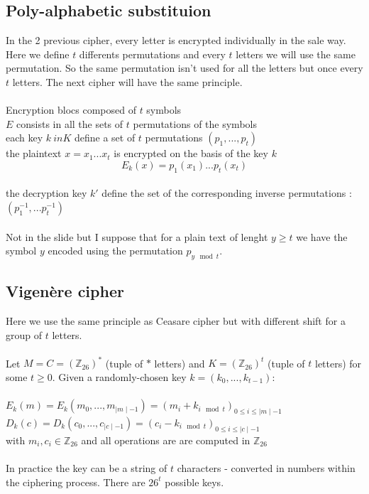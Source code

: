 \documentclass[11pt,a4paper]{report}
\begin{document}
\subsection{Poly-alphabetic substituion}
In the 2 previous cipher, every letter is encrypted individually in the sale way. Here we define $t$ differents permutations and every $t$ letters we will use the same permutation. So the same permutation isn't used for all the letters but once every $t$ letters. The next cipher will have the same principle.\\
\\
Encryption blocs composed of $t$ symbols\\
$E$ consists in all the sets of $t$ permutations of the symbols\\
each key $k \ in K$ define a set of $t$ permutations $\left( p_1,...,p_t \right)$\\
the plaintext $x = x_1 ... x_t$ is encrypted on the basis of the key $k$
$$E_k(x) = p_1(x_1) ... p_t(x_t)$$\\
 the decryption key $k'$ define the set of the corresponding inverse permutations : $\left( p_1^{-1} , ... p_t^{-1} \right)$\\
 \\Not in the slide but I suppose that for a plain text of lenght $ y \geq t$ we have the symbol $y$ encoded using the permutation $p_{y\mod t}$.

\subsection{Vigenère cipher}
Here we use the same principle as Ceasare cipher but with different shift for a group of $t$ letters.\\
\\
Let $M = C = \left( \mathbb{Z}_{26} \right)^* $ (tuple of $*$ letters) and $K = \left( \mathbb{Z}_{26} \right)^t$ (tuple of $t$ letters) for some $t \geq 0$. Given a randomly-chosen key $k = (k_0, ..., k_{t-1})$:\\
\\
$E_k(m) = E_k(m_0,...,m_{\mid m \mid -1}) = (m_i + k_{i\mod t})_{0 \leq i \leq \mid m \mid -1}$\\
$D_k(c) = D_k(c_0,...,c_{\mid c \mid -1}) = (c_i - k_{i\mod t})_{0 \leq i \leq \mid c \mid -1}$\\
with $m_i,c_i \in \mathbb{Z}_{26} $ and all operations are are computed in $\mathbb{Z}_{26}$\\
\\
In practice the key can be a string of $t$ characters - converted in numbers within the ciphering process. There are $26^t$ possible keys.
\end{document}
